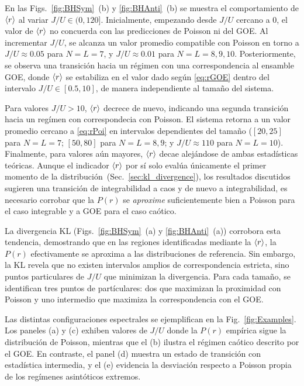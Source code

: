\documentclass[10pt,a4paper]{article}
\begin{document}
En las Figs.~\ref{fig:BHSym}~(b) y \ref{fig:BHAnti}~(b) se muestra el comportamiento de $\ev{r}$ al variar $J/U \in (0, 120]$. Inicialmente, empezando desde $J/U$ cercano a 0, el valor de $\ev{r}$ no concuerda con las predicciones de Poisson ni del GOE. Al incrementar $J/U$, se alcanza un valor promedio compatible con Poisson en torno a $J/U \approx 0.05$ para $N=L=7$, y $J/U \approx 0.01$ para $N=L=8,9,10$. Posteriormente, se observa una transición hacia un régimen con una correspondencia al ensamble GOE, donde $\ev{r}$ se estabiliza en el valor dado según \eqref{eq:rGOE} dentro del intervalo $J/U \in [0.5, 10]$, de manera independiente al tamaño del sistema. 

Para valores $J/U > 10$, $\ev{r}$ decrece de nuevo, indicando una segunda transición hacia un regímen con correspondecia con Poisson. El sistema retorna a un valor promedio cercano a \eqref{eq:rPoi} en intervalos dependientes del tamaño ($[20,25]$ para $N=L=7$; $[50,80]$ para $N=L=8,9$; y $J/U \approx 110$ para $N=L=10$). Finalmente, para valores aún mayores, $\ev{r}$ decae alejándose de ambas estadísticas teóricas. 
Aunque el indicador $\ev{r}$ por sí solo evalúa únicamente el primer momento de la distribución~(Sec.~\ref{sec:kl_divergence}), 
los resultados discutidos sugieren una transición de integrabilidad a caos y de nuevo a integrabilidad, es necesario corrobar que la $P(r)$ se \textit{aproxime} suficientemente bien a Poisson para el caso integrable y a GOE para el caso caótico.

La divergencia KL (Figs.~\ref{fig:BHSym}~(a) y \ref{fig:BHAnti}~(a)) corrobora esta tendencia, demostrando que en las regiones identificadas mediante la $\ev{r}$, la $P(r)$ efectivamente se aproxima a las distribuciones de referencia. Sin embargo, la KL revela que no existen intervalos amplios de correspondencia estricta, sino puntos particulares de $J/U$ que minimizan la divergencia. Para cada tamaño, se identifican tres puntos de partículares: dos que maximizan la proximidad con Poisson y uno intermedio que maximiza la correspondencia con el GOE.

Las distintas configuraciones espectrales se ejemplifican en la Fig.~\ref{fig:Examples}. Los paneles (a) y (c) exhiben valores de $J/U$ donde la $P(r)$ empírica sigue la distribución de Poisson, mientras que el (b) ilustra el régimen caótico descrito por el GOE. En contraste, el panel (d) muestra un estado de transición con estadística intermedia, y el (e) evidencia la desviación respecto a Poisson propia de los regímenes asintóticos extremos.
\end{document}
